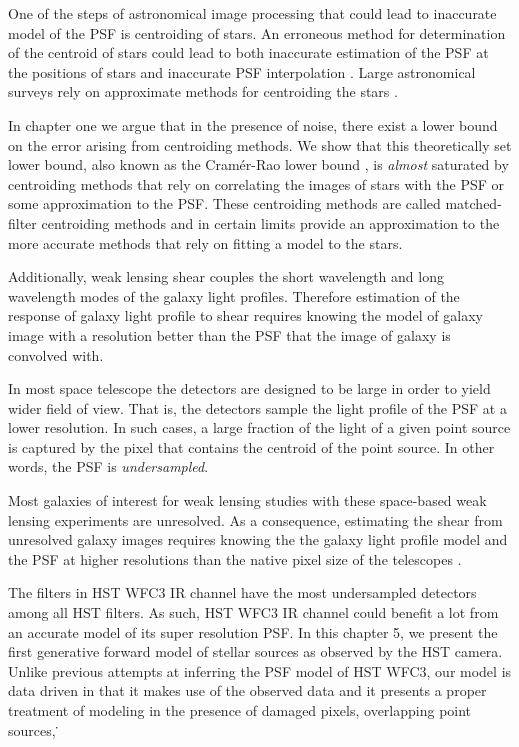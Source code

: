 One of the steps of astronomical image processing that could lead to inaccurate model of the PSF is centroiding 
of stars. An erroneous method for determination of the centroid of stars could lead to both inaccurate estimation of the 
PSF at the positions of stars and inaccurate PSF interpolation \citep{anderson2000,lupton,anderson2003,desc}. Large astronomical surveys rely on approximate 
methods for centroiding the stars \citep{sextractor,sdss,des}. 

In chapter one we argue that in the presence of noise, there exist
a lower bound on the error arising from centroiding methods. We show that this theoretically set lower bound, also known as the Cram\'{e}r-Rao lower bound \citep{lecam}, 
is \emph{almost} saturated by centroiding methods that rely on correlating the images of stars with the PSF or some approximation to the 
PSF. These centroiding methods are called matched-filter centroiding methods and in certain limits provide an approximation to the more accurate 
methods that rely on fitting a model to the stars. 

Additionally, weak lensing shear couples the short wavelength and long wavelength modes of the galaxy light profiles. 
Therefore estimation of the response of galaxy light profile to shear requires knowing the model of galaxy image 
with a resolution better than the PSF that the image of galaxy is convolved with. 

In most space telescope \citep{euclid,wfirst} the detectors are designed to be large in order to yield wider field of view. 
That is, the detectors sample the light profile of the PSF at a lower resolution. In such cases, a large fraction of the light of a given point source 
is captured by the pixel that contains the centroid of the point source. In other words, the PSF is \emph{undersampled}.

Most galaxies of interest for weak lensing studies with these space-based weak lensing experiments are unresolved. 
As a consequence, estimating the shear from unresolved galaxy images requires 
knowing the the galaxy light profile model and the PSF at higher resolutions than the native pixel size of the telescopes \citep{olic,ngole2}.

The filters in HST WFC3 IR channel have the most undersampled detectors among all HST filters. 
As such, HST WFC3 IR channel could benefit a lot from an accurate model of its super resolution PSF. 
In this chapter 5, we present the first generative forward model of stellar sources as observed by the HST camera.
Unlike previous attempts at inferring the PSF model of HST WFC3, our model is data driven in that it makes 
use of the observed data and it presents a proper treatment of modeling in the presence of damaged pixels, overlapping 
point sources, \etc\.  

